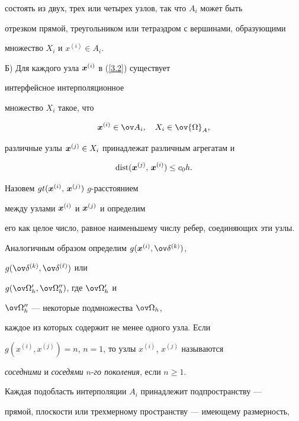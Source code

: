 состоять из двух, трех или четырех узлов, так что $A_i$ может быть


отрезком прямой, треугольником или тетраэдром с вершинами, образующими


множество $X_i$ и $x^{(i)}\in A_i$.





Б) Для каждого узла $\boldsymbol x^{(i)}$ в (\ref{3.2}) существует


интерфейсное интерполяционное


множество $X_i$ такое, что


$$


\bi x^{(i)}\in\ov A_i,\quad X_i\in\ov{\Omega}_A,


$$


различные узлы ${\boldsymbol x}^{(j)}\in X_i$ принадлежат различным агрегатам и


\begin{equation}\label{3.3}


\dist(\bi x^{(j)}, \, \bi x^{(i)})\le c_0 h.


\end{equation}





Назовем $gt(\boldsymbol x^{(i)},\,\boldsymbol x^{(j)})$\; $g$-{расстоянием}


между узлами $\boldsymbol x^{(i)}$ и $\boldsymbol x^{(j)}$ и определим


его как целое число, равное наименьшему числу ребер, соединяющих эти узлы.


Аналогичным образом определим $g(\bi x^{(i)},\ov\delta^{(k)})$,


$g(\ov\delta^{(k)},\ov\delta^{(\ell)})$ или


$g(\ov\Omega'_h,\ov\Omega''_h)$, где $\ov\Omega'_h$ и


$\ov\Omega''_h$ --- некоторые подмножества $\ov\Omega_h$,


каждое из которых содержит не менее одного узла. Если


$g(x^{(i)},x^{(j)})=n$, $n=1$, то узлы $x^{(i)}$, $x^{(j)}$ называются


{\em соседними} и {\em соседями} $n$-{\em го поколения}, если $n\ge 1$.





Каждая подобласть интерполяции $A_i$ принадлежит подпространству ---


прямой, плоскости или трехмерному пространству --- имеющему размерность,


